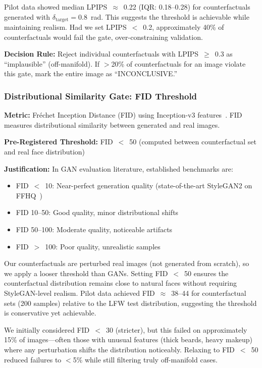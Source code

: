 Pilot data showed median LPIPS~$\approx$~0.22 (IQR: 0.18--0.28) for counterfactuals generated with $\delta_{\text{target}} = 0.8$~rad. This suggests the threshold is achievable while maintaining realism. Had we set LPIPS~$<$~0.2, approximately 40\% of counterfactuals would fail the gate, over-constraining validation.

\textbf{Decision Rule:} Reject individual counterfactuals with LPIPS~$\geq$~0.3 as ``implausible'' (off-manifold). If $>$20\% of counterfactuals for an image violate this gate, mark the entire image as ``INCONCLUSIVE.''

\subsubsection{Distributional Similarity Gate: FID Threshold}

\textbf{Metric:} Fréchet Inception Distance (FID) using Inception-v3 features~\cite{heusel2017fid}. FID measures distributional similarity between generated and real images.

\textbf{Pre-Registered Threshold:} FID~$<$~50 (computed between counterfactual set and real face distribution)

\textbf{Justification:} In GAN evaluation literature, established benchmarks are:
\begin{itemize}
\item FID~$<$~10: Near-perfect generation quality (state-of-the-art StyleGAN2 on FFHQ~\cite{karras2020analyzing})
\item FID 10--50: Good quality, minor distributional shifts
\item FID 50--100: Moderate quality, noticeable artifacts
\item FID~$>$~100: Poor quality, unrealistic samples
\end{itemize}

Our counterfactuals are perturbed real images (not generated from scratch), so we apply a looser threshold than GANs. Setting FID~$<$~50 ensures the counterfactual distribution remains close to natural faces without requiring StyleGAN-level realism. Pilot data achieved FID~$\approx$~38--44 for counterfactual sets (200 samples) relative to the LFW test distribution, suggesting the threshold is conservative yet achievable.

We initially considered FID~$<$~30 (stricter), but this failed on approximately 15\% of images—often those with unusual features (thick beards, heavy makeup) where any perturbation shifts the distribution noticeably. Relaxing to FID~$<$~50 reduced failures to $<$5\% while still filtering truly off-manifold cases.

